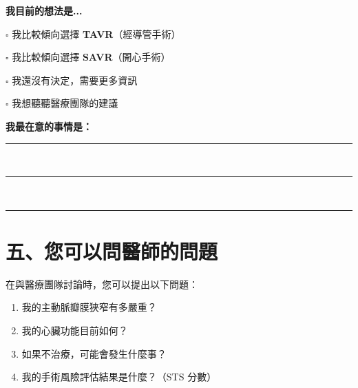 \documentclass[12pt,a4paper]{article}
\begin{document}
\begin{questionbox}
\begin{center}
{\Large\bfseries\textcolor{pda_purple}{我目前的想法是...}}\\[0.5cm]
\end{center}

$\square$ 我比較傾向選擇 \textbf{TAVR}（經導管手術）

$\square$ 我比較傾向選擇 \textbf{SAVR}（開心手術）

$\square$ 我還沒有決定，需要更多資訊

$\square$ 我想聽聽醫療團隊的建議

\vspace{0.5cm}

\textbf{我最在意的事情是：}\\[0.3cm]
\rule{\textwidth}{0.5pt}\\[0.5cm]
\rule{\textwidth}{0.5pt}\\[0.5cm]
\rule{\textwidth}{0.5pt}

\end{questionbox}

\newpage

\section*{\textcolor{emergency_red}{\Large 五、您可以問醫師的問題}}

\begin{center}
{\large 在與醫療團隊討論時，您可以提出以下問題：}
\end{center}

\vspace{0.5cm}

\begin{checklistbox}[關於我的病情]
\begin{enumerate}[leftmargin=*, itemsep=8pt]
    \item[$\square$] 我的主動脈瓣膜狹窄有多嚴重？
    \item[$\square$] 我的心臟功能目前如何？
    \item[$\square$] 如果不治療，可能會發生什麼事？
    \item[$\square$] 我的手術風險評估結果是什麼？（STS 分數）
\end{enumerate}
\end{checklistbox}
\end{document}
